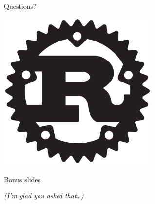 \documentclass[xcolor=dvipsnames]{beamer}
\begin{document}

\begin{frame}{Questions?}
	\begin{center}
		\includegraphics[width=0.6\textwidth]{rust.png}
	\end{center}
\end{frame}

\begin{frame}{Bonus slides}
	\begin{center}
	\large \textit{(I'm glad you asked that\dots)}
	\end{center}
\end{frame}
\end{document}
